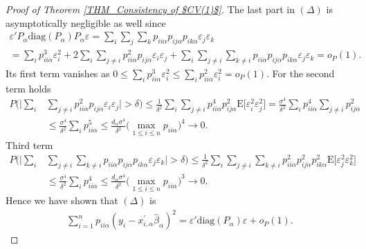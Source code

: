\documentclass[Research_Module_ES.tex]{subfiles}
\begin{document}
\begin{proof}[Proof of Theorem \ref{THM_Consistency of $CV(1)$}]
	The last part in $(\Delta)$ is asymptotically negligible as well since
	\begin{align*}
	\varepsilon'P_\alpha\mathrm{diag}(P_\alpha)P_\alpha \varepsilon = \sum_i\sum_j\sum_k p_{ii\alpha}p_{ij\alpha}p_{ik\alpha}\varepsilon_j\varepsilon_k\\
	=\sum_i p_{ii\alpha}^3 \varepsilon_i^2 +2\sum_i\sum_{j\neq i}p_{ii\alpha}^2p_{ij\alpha}\varepsilon_i\varepsilon_j + 
	\sum_i\sum_{j\neq i}\sum_{k\neq i}p_{ii\alpha}p_{ij\alpha}p_{ik\alpha}\varepsilon_j\varepsilon_k=o_P(1).
	\end{align*}
	Its first term vanishes as $0\le \sum_i p_{ii\alpha}^3 \varepsilon_i^2 \le \sum_i p_{ii\alpha}^2 \varepsilon_i^2 = o_P(1)$.
	For the second term holds
	\begin{align*}
	P\biggl(\biggl|\sum_{i}&\sum_{j\neq i}p_{ii\alpha}^2p_{ij\alpha}\varepsilon_i\varepsilon_j\biggr|>\delta\biggr)\le\frac{1}{\delta^2}\sum_{i}\sum_{j\neq i}p_{ii\alpha}^4p_{ij\alpha}^2\mathrm{E}\bigl[\varepsilon_i^2\varepsilon_j^2\bigr]
	= \frac{\sigma^4}{\delta^2}\sum_{i}p_{ii\alpha}^4\sum_{j\neq i}p_{ij\alpha}^2\\
	&\le \frac{\sigma^4}{\delta^2}\sum_{i}p_{ii\alpha}^5 \le \frac{d_\alpha\sigma^4}{\delta^2}\biggl(\max_{1\le i\le n}p_{ii\alpha}\biggr)^4 \to 0.
	\end{align*}
	Third term
	\begin{align*}
	P\biggl(\biggl|\sum_i&\sum_{j\neq i}\sum_{k\neq i}p_{ii\alpha}p_{ij\alpha}p_{ik\alpha}\varepsilon_j\varepsilon_k\biggr|>\delta\biggr)\le\frac{1}{\delta^2}\sum_i\sum_{j\neq i}\sum_{k\neq i}p_{ii\alpha}^2p_{ij\alpha}^2p_{ik\alpha}^2\mathrm{E}\bigl[\varepsilon_j^2\varepsilon_k^2\bigr]\\
	&\le \frac{\sigma^4}{\delta^2} \sum_i p_{ii\alpha}^4 \le \frac{d_\alpha\sigma^4}{\delta^2}\biggl(\max_{1\le i\le n}p_{ii\alpha}\biggr)^3 \to 0.
	\end{align*}
	Hence we have shown that $(\Delta)$ is 
	\begin{align*}
	\sum_{i=1}^n p_{ii\alpha}(y_i-x_{i,\alpha}^\prime\hat{\beta}_\alpha)^2 = \varepsilon'\mathrm{diag}(P_\alpha)\varepsilon + o_P(1).
	\end{align*}
	

\end{proof}
\end{document}
